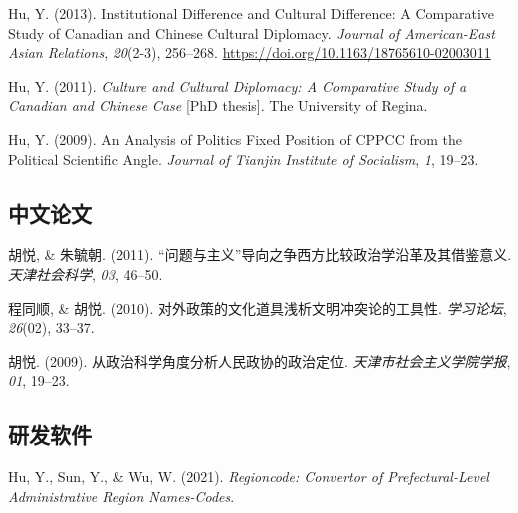 \documentclass[11pt, a4paper]{awesome-cv}
\begin{document}
\leavevmode\hypertarget{ref-Hu2013}{}%
Hu, Y. (2013). Institutional {Difference} and {Cultural Difference}: {A
Comparative Study} of {Canadian} and {Chinese Cultural Diplomacy}.
\emph{Journal of American-East Asian Relations}, \emph{20}(2-3),
256--268. \url{https://doi.org/10.1163/18765610-02003011}

\leavevmode\hypertarget{ref-Hu2011}{}%
Hu, Y. (2011). \emph{Culture and {Cultural Diplomacy}: {A Comparative
Study} of a {Canadian} and {Chinese Case}} {[}PhD thesis{]}. The
University of Regina.

\leavevmode\hypertarget{ref-Hu2009}{}%
Hu, Y. (2009). {An Analysis of Politics Fixed Position of CPPCC from the
Political Scientific Angle}. \emph{Journal of Tianjin Institute of
Socialism}, \emph{1}, 19--23.

\endgroup

\hypertarget{ux4e2dux6587ux8bbaux6587}{%
\subsection{\texorpdfstring{\textbf{中文论文}}{中文论文}}\label{ux4e2dux6587ux8bbaux6587}}

\begingroup
\setlength{\parindent}{-0.5in}
\setlength{\leftskip}{0.5in}

\hypertarget{refs_chinese}{}
\leavevmode\hypertarget{ref-HuYueZhuYuZhao2011}{}%
胡悦, \& 朱毓朝. (2011).
{{``问题与主义''}导向之争{}{}西方比较政治学沿革及其借鉴意义}.
\emph{天津社会科学}, \emph{03}, 46--50.

\leavevmode\hypertarget{ref-ChengTongShunHuYue2010}{}%
程同顺, \& 胡悦. (2010). {对外政策的文化道具{}{}浅析文明冲突论的工具性}.
\emph{学习论坛}, \emph{26}(02), 33--37.

\leavevmode\hypertarget{ref-HuYue2009}{}%
胡悦. (2009). {从政治科学角度分析人民政协的政治定位}.
\emph{天津市社会主义学院学报}, \emph{01}, 19--23.

\endgroup

\hypertarget{ux7814ux53d1ux8f6fux4ef6}{%
\subsection{\texorpdfstring{\textbf{研发软件}}{研发软件}}\label{ux7814ux53d1ux8f6fux4ef6}}

\begingroup
\setlength{\parindent}{-0.5in}
\setlength{\leftskip}{0.5in}

\hypertarget{refs_software}{}
\leavevmode\hypertarget{ref-HuEtAl2021}{}%
Hu, Y., Sun, Y., \& Wu, W. (2021). \emph{Regioncode: {Convertor} of
{Prefectural}-{Level Administrative Region Names}-{Codes}}.
\end{document}
